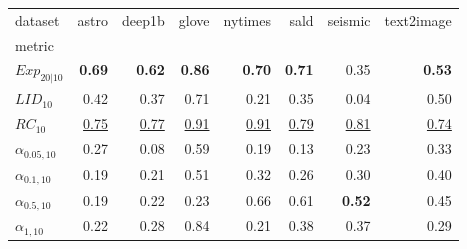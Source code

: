 \begin{tabular}{lrrrrrrr}
dataset & astro & deep1b & glove & nytimes & sald & seismic & text2image \\
metric &  &  &  &  &  &  &  \\
$Exp_{20|10}$ & \textbf{0.69} & \textbf{0.62} & \textbf{0.86} & \textbf{0.70} & \textbf{0.71} & 0.35 & \textbf{0.53} \\
$LID_{10}$ & 0.42 & 0.37 & 0.71 & 0.21 & 0.35 & 0.04 & 0.50 \\
$RC_{10}$ & \underline{0.75} & \underline{0.77} & \underline{0.91} & \underline{0.91} & \underline{0.79} & \underline{0.81} & \underline{0.74} \\
$\alpha_{0.05, 10}$ & 0.27 & 0.08 & 0.59 & 0.19 & 0.13 & 0.23 & 0.33 \\
$\alpha_{0.1, 10}$ & 0.19 & 0.21 & 0.51 & 0.32 & 0.26 & 0.30 & 0.40 \\
$\alpha_{0.5, 10}$ & 0.19 & 0.22 & 0.23 & 0.66 & 0.61 & \textbf{0.52} & 0.45 \\
$\alpha_{1, 10}$ & 0.22 & 0.28 & 0.84 & 0.21 & 0.38 & 0.37 & 0.29 \\
\end{tabular}
